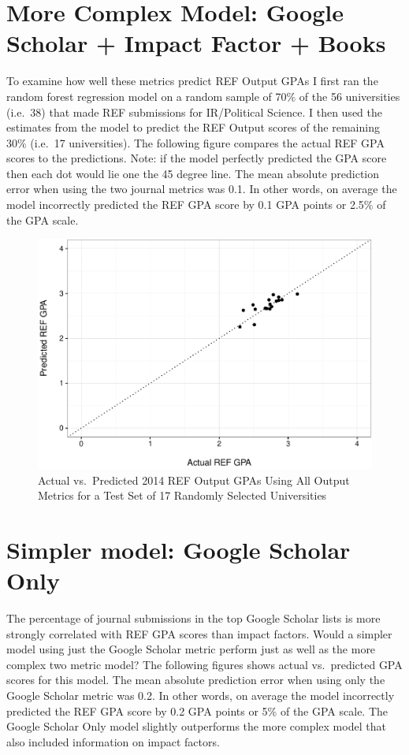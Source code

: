 \documentclass[]{article}
\begin{document}
\section{More Complex Model: Google Scholar + Impact Factor +
Books}\label{more-complex-model-google-scholar-impact-factor-books}

To examine how well these metrics predict REF Output GPAs I first ran
the random forest regression model on a random sample of 70\% of the 56
universities (i.e.~38) that made REF submissions for IR/Political
Science. I then used the estimates from the model to predict the REF
Output scores of the remaining 30\% (i.e.~17 universities). The
following figure compares the actual REF GPA scores to the predictions.
Note: if the model perfectly predicted the GPA score then each dot would
lie one the 45 degree line. The mean absolute prediction error when
using the two journal metrics was 0.1. In other words, on average the
model incorrectly predicted the REF GPA score by 0.1 GPA points or 2.5\%
of the GPA scale.

\begin{figure}[htbp]
\centering
\includegraphics{README_files/figure-latex/unnamed-chunk-1-1.pdf}
\caption{Actual vs.~Predicted 2014 REF Output GPAs Using All Output
Metrics for a Test Set of 17 Randomly Selected Universities}
\end{figure}

\section{Simpler model: Google Scholar
Only}\label{simpler-model-google-scholar-only}

The percentage of journal submissions in the top Google Scholar lists is
more strongly correlated with REF GPA scores than impact factors. Would
a simpler model using just the Google Scholar metric perform just as
well as the more complex two metric model? The following figures shows
actual vs.~predicted GPA scores for this model. The mean absolute
prediction error when using only the Google Scholar metric was 0.2. In
other words, on average the model incorrectly predicted the REF GPA
score by 0.2 GPA points or 5\% of the GPA scale. The Google Scholar Only
model slightly outperforms the more complex model that also included
information on impact factors.
\end{document}
